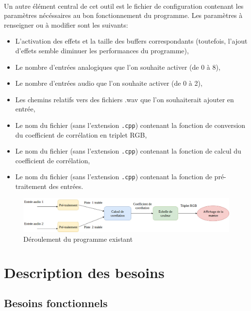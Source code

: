 \documentclass{article}
\begin{document}
\paragraph{}
Un autre élément central de cet outil est le fichier de configuration
contenant les paramètres nécéssaires au bon fonctionnement du programme. Les
paramètres à renseigner ou à modifier sont les suivants:
\begin{itemize}
	\item L'activation des effets et la taille des buffers correspondants
	      (toutefois, l'ajout d'effets semble diminuer les performances du
	      programme),
	\item Le nombre d'entrées analogiques que l'on souhaite activer (de 0 à 8),
	\item Le nombre d'entrées audio que l'on souhaite activer (de 0 à 2),
	\item Les chemins relatifs vers des fichiers .wav que l'on souhaiterait
	      ajouter en entrée,
	\item Le nom du fichier (sans l'extension \verb!.cpp!) contenant la
	      fonction de conversion du coefficient de corrélation en triplet RGB,
	\item Le nom du fichier (sans l'extension \verb!.cpp!) contenant la
	      fonction de calcul du coefficient de corrélation,
	\item Le nom du fichier (sans l'extension \verb!.cpp!) contenant la
	      fonction de pré-traitement des entrées.
\end{itemize}
\begin{figure}[h]
	\caption{\label{bela_process}Déroulement du programme existant}
	\centering
	\includegraphics[scale=0.40]{bela_process.jpg}
\end{figure}
\newpage
\section{Description des besoins}
\subsection{Besoins fonctionnels}
\end{document}
